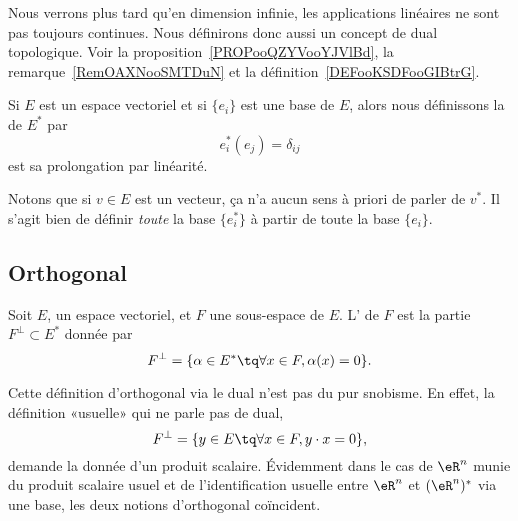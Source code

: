 Nous verrons plus tard qu'en dimension infinie, les applications linéaires ne sont pas toujours continues. Nous définirons donc aussi un concept de dual topologique. Voir la proposition~\ref{PROPooQZYVooYJVlBd}, la remarque~\ref{RemOAXNooSMTDuN} et la définition~\ref{DEFooKSDFooGIBtrG}.

\begin{definition}      \label{DEFooTMSEooZFtsqa}
    Si \( E\) est un espace vectoriel et si \( \{ e_i \}\) est une base de \( E\), alors nous définissons la  de \( E^*\) par
    \begin{equation}
        e_i^*(e_j)=\delta_{ij}
    \end{equation}
    est sa prolongation par linéarité.
\end{definition}
Notons que si \( v\in E\) est un vecteur, ça n'a aucun sens à priori de parler de \( v^*\). Il s'agit bien de définir \emph{toute} la base \( \{ e_i^* \}\) à partir de toute la base \( \{ e_i \}\).

\subsection{Orthogonal}

\begin{definition}      \label{DEFooEQSMooHVzbfz}
    Soit \( E\), un espace vectoriel, et \( F\) une sous-espace de \( E\). L' de \( F\) est la partie \( F^{\perp}\subset E^*\) donnée par
    \begin{equation}    \label{Eqiiyple}
        F^{\perp}=\{ \alpha\in E^*\tq \forall x\in F,\alpha(x)=0 \}.
    \end{equation}
\end{definition}

Cette définition d'orthogonal via le dual n'est pas du pur snobisme. En effet, la définition «usuelle» qui ne parle pas de dual,
\begin{equation}
    F^{\perp}=\{ y\in E\tq \forall x\in F,y\cdot x=0 \},
\end{equation}
demande la donnée d'un produit scalaire. Évidemment dans le cas de \( \eR^n\) munie du produit scalaire usuel et de l'identification usuelle entre \( \eR^n\) et \( (\eR^n)^*\) via une base, les deux notions d'orthogonal coïncident.

